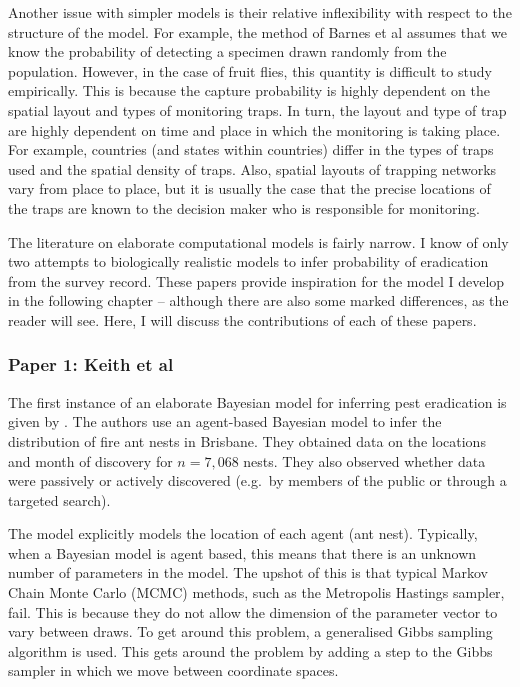 \documentclass[
]{book}
\begin{document}
Another issue with simpler models is their relative inflexibility with respect to the structure of the model. For example, the method of Barnes et al assumes that we know the probability of detecting a specimen drawn randomly from the population. However, in the case of fruit flies, this quantity is difficult to study empirically. This is because the capture probability is highly dependent on the spatial layout and types of monitoring traps. In turn, the layout and type of trap are highly dependent on time and place in which the monitoring is taking place. For example, countries (and states within countries) differ in the types of traps used and the spatial density of traps. Also, spatial layouts of trapping networks vary from place to place, but it is usually the case that the precise locations of the traps are known to the decision maker who is responsible for monitoring.

The literature on elaborate computational models is fairly narrow. I know of only two attempts to biologically realistic models to infer probability of eradication from the survey record. These papers provide inspiration for the model I develop in the following chapter -- although there are also some marked differences, as the reader will see. Here, I will discuss the contributions of each of these papers.

\hypertarget{paper-1-keith-et-al}{%
\subsubsection{Paper 1: Keith et al}\label{paper-1-keith-et-al}}

The first instance of an elaborate Bayesian model for inferring pest eradication is given by \citet{keith2013}. The authors use an agent-based Bayesian model to infer the distribution of fire ant nests in Brisbane. They obtained data on the locations and month of discovery for \(n = 7{,}068\) nests. They also observed whether data were passively or actively discovered (e.g.~by members of the public or through a targeted search).

The model explicitly models the location of each agent (ant nest). Typically, when a Bayesian model is agent based, this means that there is an unknown number of parameters in the model. The upshot of this is that typical Markov Chain Monte Carlo (MCMC) methods, such as the Metropolis Hastings sampler, fail. This is because they do not allow the dimension of the parameter vector to vary between draws. To get around this problem, a generalised Gibbs sampling algorithm is used. This gets around the problem by adding a step to the Gibbs sampler in which we move between coordinate spaces.
\end{document}
